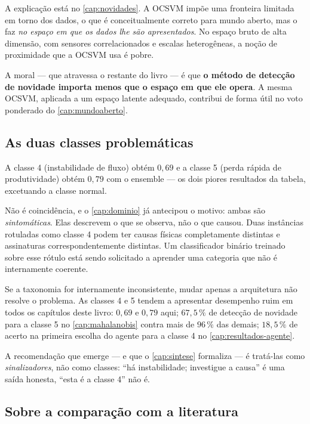 A explicação está no \cref{cap:novidades}. A OCSVM impõe uma fronteira limitada em torno
dos dados, o que é conceitualmente correto para mundo aberto, mas o faz \emph{no espaço
em que os dados lhe são apresentados}. No espaço bruto de alta dimensão, com sensores
correlacionados e escalas heterogêneas, a noção de proximidade que a OCSVM usa é
pobre.

A moral --- que atravessa o restante do livro --- é que \textbf{o método de detecção de
novidade importa menos que o espaço em que ele opera}. A mesma OCSVM, aplicada a um
espaço latente adequado, contribui de forma útil no voto ponderado do
\cref{cap:mundoaberto}.

\subsection{As duas classes problemáticas}

A classe 4 (instabilidade de fluxo) obtém $0{,}69$ e a classe 5 (perda rápida de
produtividade) obtém $0{,}79$ com o ensemble --- os dois piores resultados da tabela,
excetuando a classe normal.

Não é coincidência, e o \cref{cap:dominio} já antecipou o motivo: ambas são
\emph{sintomáticas}. Elas descrevem o que se observa, não o que causou. Duas instâncias
rotuladas como classe 4 podem ter causas físicas completamente distintas e assinaturas
correspondentemente distintas. Um classificador binário treinado sobre esse rótulo está
sendo solicitado a aprender uma categoria que não é internamente coerente.

\begin{destaque}
Se a taxonomia for internamente inconsistente, mudar apenas a arquitetura não resolve o
problema. As classes 4 e 5 tendem a
apresentar desempenho ruim em todos os capítulos deste livro: $0{,}69$ e $0{,}79$ aqui;
$67{,}5\,\%$ de detecção de novidade para a classe 5 no \cref{cap:mahalanobis} contra
mais de $96\,\%$ das demais; $18{,}5\,\%$ de acerto na primeira escolha do agente para a
classe 4 no \cref{cap:resultados-agente}.

A recomendação que emerge --- e que o \cref{cap:sintese} formaliza --- é tratá-las como
\emph{sinalizadores}, não como classes: ``há instabilidade; investigue a causa'' é uma
saída honesta, ``esta é a classe 4'' não é.
\end{destaque}

\subsection{Sobre a comparação com a literatura}

